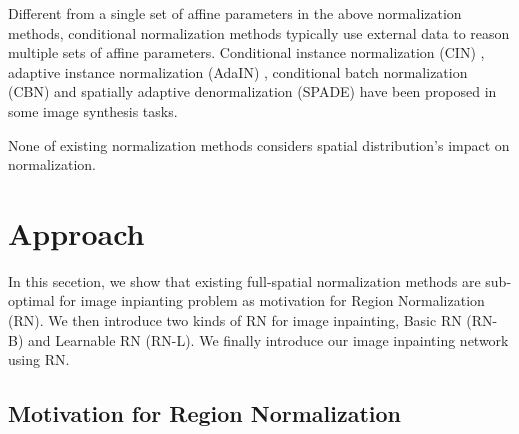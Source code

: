 \documentclass[letterpaper]{article} %
\begin{document}
Different from a single set of affine parameters in the above normalization methods, conditional normalization methods typically use external data to reason multiple sets of affine parameters.
Conditional instance normalization (CIN) \cite{dumoulin2016learned}, adaptive instance normalization (AdaIN) \cite{huang2017arbitrary}, conditional batch normalization (CBN) \cite{de2017modulating} and spatially adaptive denormalization (SPADE) \cite{park2019semantic} have been proposed in some image synthesis tasks.

None of existing normalization methods considers spatial distribution's impact on normalization.



\section{Approach}
In this secetion, we show that existing full-spatial normalization methods are sub-optimal for image inpianting problem as motivation for Region Normalization (RN). We then introduce two kinds of RN for image inpainting, Basic RN (RN-B) and Learnable RN (RN-L). We finally introduce our image inpainting network using RN.


\subsection{Motivation for Region Normalization}
\end{document}
